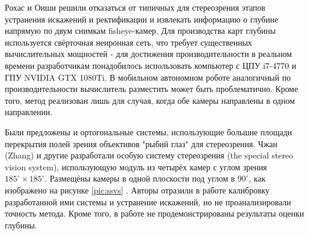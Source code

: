 Рохас и Оиши \cite{direct_neuro_stereo} решили отказаться от типичных для стереозрения этапов устранения искажений и ректификации %
и извлекать информацию о глубине напрямую по двум снимкам fisheye-камер. Для производства карт глубины используется 
свёрточная неиронная сеть, что требует существенных вычислительных мощностей - для достижения производительности в реальном 
времени разработчикам понадобилось использовать компьютер с ЦПУ i7-4770 и ГПУ NVIDIA GTX 1080Ti. В мобильном автономном роботе
аналогичный по производительности вычислитель разместить может быть проблематично. Кроме того, метод реализован лишь для случая, когда
 обе камеры направлены в одном направлении. 

Были предложены и ортогональные системы, использующие большие площади перекрытия полей зрения объективов "рыбий глаз" для 
стереозрения. %
Чжан (Zhang) и другие разработали особую систему стереозрения (the special stereo vision system), использующую модуль из четырёх камер с углом зрения
$185^\circ \times 185^\circ$. Размещёны камеры в одной плоскости под углом в $90^\circ$, как изображено на рисунке \ref{pic:ssvs} \cite{zhang_system}.
Авторы отразили в работе калибровку разработанной ими системы и устранение искажений, но не проанализировали точность метода. Кроме того,
в работе не продемонстрированы  результаты  оценки глубины. 


